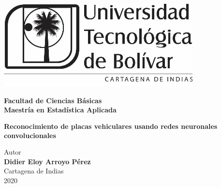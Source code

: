 \renewcommand{\tablename}{Tabla}
\thispagestyle{empty}
\begin{center}
\includegraphics[width=0.5 \textwidth]{imagenes/logoUTB_BW.jpg} \\
\vspace{1.0cm}
{\large \textbf{Facultad de Ciencias Básicas} \\
\vspace{0.15cm}
{\large \textbf{Maestría en Estadística Aplicada}}

\vspace{2.5cm}
{\Large\color{AzulClaro} \textbf{Reconocimiento de placas vehiculares usando redes neuronales convolucionales}
}\\
\vspace{2.5cm}

Autor \\
\vspace{0.70cm}
{\large \textbf{Didier Eloy Arroyo Pérez}
}\\


\vspace{4.0cm}
Cartagena de Indias\\
\vspace{0.25cm}
2020
}
\end{center}
\newpage
